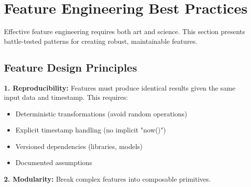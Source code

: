 \section{Feature Engineering Best Practices}

Effective feature engineering requires both art and science. This section presents battle-tested patterns for creating robust, maintainable features.

\subsection{Feature Design Principles}

\textbf{1. Reproducibility:} Features must produce identical results given the same input data and timestamp. This requires:

\begin{itemize}
    \item Deterministic transformations (avoid random operations)
    \item Explicit timestamp handling (no implicit "now()")
    \item Versioned dependencies (libraries, models)
    \item Documented assumptions
\end{itemize}

\textbf{2. Modularity:} Break complex features into composable primitives.

